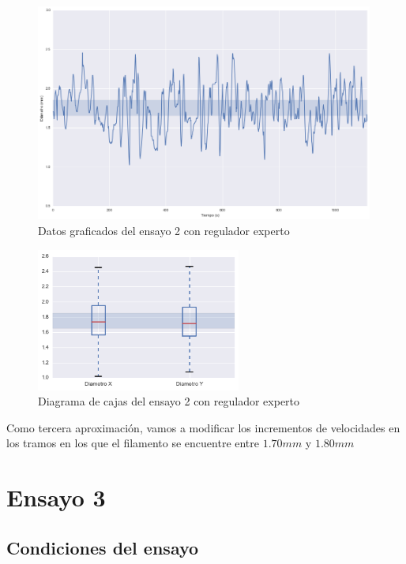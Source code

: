 \begin{figure}[H]
    \centering
    \includegraphics[width=0.99\textwidth]{images/producciones/12082015/output_9_e1.png}
    \caption{Datos graficados del ensayo 2 con regulador experto}
    \label{fig:reg_graf2}
\end{figure}

\begin{figure}[H]
    \centering
    \includegraphics[width=0.6\textwidth]{images/producciones/12082015/output_10_e1.png}
    \caption{Diagrama de cajas del ensayo 2 con regulador experto}
    \label{fig:reg_cajas2}
\end{figure}

Como tercera aproximación, vamos a modificar los incrementos de velocidades en los tramos en los que el filamento se encuentre entre  $1.70 mm$ y $1.80 mm$

\section{Ensayo 3}

\subsection{Condiciones del ensayo}

